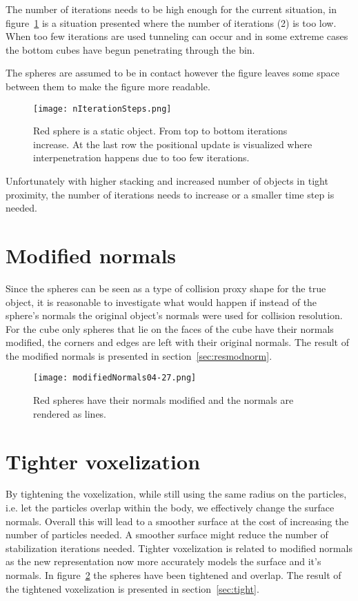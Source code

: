 The number of iterations needs to be high enough for the current situation, in
figure~\ref{fig:iters} is a situation presented where the number of iterations (2) is too low.
 When too few iterations are used tunneling can occur
and in some extreme cases the bottom cubes have begun penetrating through the bin.

The spheres are assumed to be in contact however
the figure leaves some space between them to make the figure more readable.

\begin{figure}[H]
  \centering
  \texttt{[image: nIterationSteps.png]}
  \caption{Red sphere is a static object. From top to bottom iterations increase. At the last row the positional update is visualized where interpenetration happens due to too few iterations.}
  \label{fig:iters}
\end{figure}

Unfortunately with higher stacking and increased number of objects in tight proximity,
the number of iterations needs to increase or a smaller time step is needed.

\section{Modified normals}\label{sec:modnorm}
Since the spheres can be seen as a type of collision proxy shape for the true object,
it is reasonable to investigate what would happen if instead of the sphere's normals
the original object's normals were used for collision resolution. For the cube only
spheres that lie on the faces of the cube have their normals modified, the corners
and edges are left with their original normals. The result of the modified normals
is presented in section~\ref{sec:resmodnorm}.

\begin{figure}[H]
  \centering
  \texttt{[image: modifiedNormals04-27.png]}
  \caption{Red spheres have their normals modified and the normals are rendered as lines.}
  \label{fig:modnorm}
\end{figure}

\section{Tighter voxelization}
By tightening the voxelization, while still using the same radius on the particles,
i.e. let the particles overlap within the body, we effectively change the surface
normals. Overall this will lead to a smoother surface at the cost of increasing the number
of particles needed. A smoother surface might reduce the number of stabilization iterations needed.
Tighter voxelization is related to modified normals as the new
representation now more accurately models the surface and it's normals. In figure~\ref{fig:modnorm}
the spheres have been tightened and overlap. The result of the tightened voxelization is presented in section~\ref{sec:tight}.

